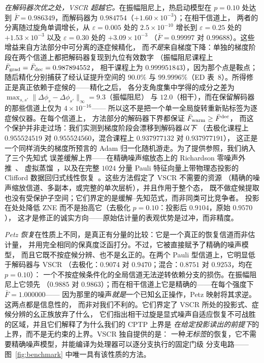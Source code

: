 \documentclass[11pt,a4paper]{article}
\begin{document}
\emph{在解码器次优之处，VSCR 超越它。}在振幅阻尼上，热启动模型在 $p=0.10$ 处达到
$\bar F=0.986349$，而解码器为 $0.984754$（$+1.60\times10^{-3}$）；在相干信道上，
两者的分离随过旋角单调增长，从 $\varepsilon=0.005$ 处的 $2.5\times10^{-10}$ 增长到
$\varepsilon=0.25$ 处的 $+1.53\times10^{-3}$ 以及 $\varepsilon=0.30$ 处的 $+3.09\times10^{-3}$
（$\bar F=0.99997$ 对 $0.99688$）。这些增益来自方法部分中可分离的逐症候精化，
而\emph{不是}来自梯度下降：单独的梯度阶段在两个信道上都把解码器复现到九位有效数字
（振幅阻尼课程上 $\bar F_{\rm grad}=\bar F_{\rm dec}=0.987894552$，
相干课程上为 $0.999951843$），因为那个点是鞍点；随后精化分别捕获了经认证提升空间的
$90.0\%$ 与 $99.9996\%$（ED 表~8）。所得修正是真正依赖于症候的——精化之后，
各分支角度集中学得的成分之差为
$\max_{s,s'}\lVert\Delta\phi_s-\Delta\phi_{s'}\rVert_\infty=9.3$（振幅阻尼）
与 $12.0$（相干），而在保留解码器的那些信道上仅为 $4\times10^{-16}$——
所以这不是把一个单一全局旋转重新贴标签为逐症候仪器。在每个信道上，
方法部分的解码器下界都保证 $\bar F_{\rm warm}\ge\bar F^{\rm dec}$，
而这个保护并非走过场：我们实测到梯度阶段会漂移到解码器\emph{以下}
（去极化课程上 $0.955524519$ 对 $0.955524560$，混合课程上 $0.937977132$ 对 $0.937977191$），
这正是一个同样消失的梯度所预言的 Adam 归一化随机游走。为了提供参照，我们纳入了三个先知式
误差缓解上界——在精确噪声缩放态上的 Richardson 零噪声外推~\cite{temme_zne,endo_zne}、
虚拟蒸馏~\cite{huggins_vd,vikstal_vd}，以及在完整 $1024$ 分量 Pauli 特征向量上带物理态投影的
Clifford 数据回归式线性恢复~\cite{czarnik_cdr,cai_em_review}。这些方法假定了 VSCR 不需要的资源
（精确的噪声缩放信道、多副本，或完整的单次层析），并且作用于整个态，
既不做症候提取也没有受保护子空间；它们界定的是缓解--先知范式，而非同类可比竞争者。
投影在处处降低 ZNE 而不是抬高它（去极化 $p=0.10$：投影后 $0.9104$，原始 $0.9570$），
这才是修正的诚实方向——原始估计量的表观优势是过冲，而非精度。

\emph{Petz 恢复}在性质上不同，是真正有分量的比较：它是一个真正的恢复信道而非估计量，
并用完全相同的保真度泛函打分。不过，它被直接赋予了精确的噪声模型，
而且它既不按症候分辨、也不是幺正的。在两个 Pauli 型信道上，它明显低于解码器与 VSCR
（去极化：$0.9074$ 对 $0.9470$；混合：$0.8751$ 对 $0.9253$，均在 $p=0.10$）：
一个不按症候条件化的全局信道无法逆转依赖分支的损伤。在振幅阻尼上它领先
（$0.9885$ 对 $0.9863$）；而在相干信道上它是精确的——在每个强度下 $\bar F=1.000000$——
因为那里的噪声\emph{就是}一个已知幺正操作，Petz 映射将其求逆。这两点都是信息性的，
而非对我们不利的。它们界定了 VSCR 所处的投影式、症候分辨的幺正族放弃了什么，
它们指出相干过旋是显式噪声自适应恢复不可战胜的区域，并且它们解释了为什么我们的 CPTP 上界是
\emph{在给定投影读出的前提下}的上界，而不是无约束的上界。VSCR 独自提供的是：
一种\emph{无标签}的恢复，它不需要精确噪声模型，并能编译为处理器可以逐分支执行的固定门级
分支电路——图~\ref{fig:benchmark} 中唯一具有该性质的方法。
\end{document}
